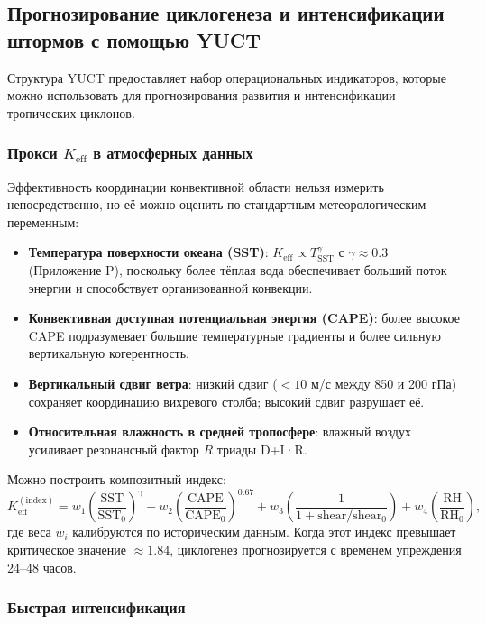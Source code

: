 \documentclass[12pt,a4paper]{article}
\newcommand{\Keff}{K_{\mathrm{eff}}}
\begin{document}
	\subsection{Прогнозирование циклогенеза и интенсификации штормов с помощью YUCT}
	\label{subsec:cyclone_prediction}
	
	Структура YUCT предоставляет набор операциональных индикаторов, которые можно использовать для прогнозирования развития и интенсификации тропических циклонов.
	
	\subsubsection*{Прокси \(K_{\mathrm{eff}}\) в атмосферных данных}
	
	Эффективность координации конвективной области нельзя измерить непосредственно, но её можно оценить по стандартным метеорологическим переменным:
	\begin{itemize}
		\item \textbf{Температура поверхности океана (SST)}: $K_{\mathrm{eff}} \propto T_{\mathrm{SST}}^{\gamma}$ с $\gamma \approx 0.3$ (Приложение P), поскольку более тёплая вода обеспечивает больший поток энергии и способствует организованной конвекции.
		\item \textbf{Конвективная доступная потенциальная энергия (CAPE)}: более высокое CAPE подразумевает большие температурные градиенты и более сильную вертикальную когерентность.
		\item \textbf{Вертикальный сдвиг ветра}: низкий сдвиг ($< 10$ м/с между 850 и 200 гПа) сохраняет координацию вихревого столба; высокий сдвиг разрушает её.
		\item \textbf{Относительная влажность в средней тропосфере}: влажный воздух усиливает резонансный фактор $R$ триады D+I·R.
	\end{itemize}
	Можно построить композитный индекс:
	\[
	\Keff^{\mathrm{(index)}} = w_1 \left( \frac{\mathrm{SST}}{\mathrm{SST}_0} \right)^{\gamma}
	+ w_2 \left( \frac{\mathrm{CAPE}}{\mathrm{CAPE}_0} \right)^{0.67}
	+ w_3 \left( \frac{1}{1 + \mathrm{shear}/\mathrm{shear}_0} \right)
	+ w_4 \left( \frac{\mathrm{RH}}{\mathrm{RH}_0} \right),
	\]
	где веса $w_i$ калибруются по историческим данным. Когда этот индекс превышает критическое значение $\approx 1.84$, циклогенез прогнозируется с временем упреждения 24–48 часов.
	
	\subsubsection*{Быстрая интенсификация}
	
\end{document}
